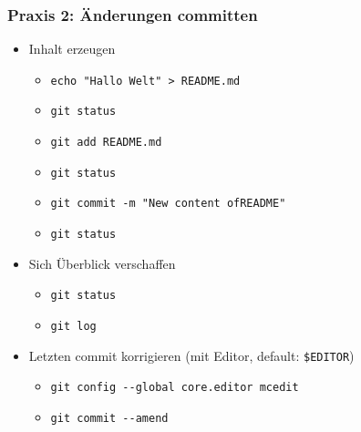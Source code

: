 \documentclass{beamer}
\begin{document}
\begin{frame}[label=gitintro40]
\frametitle{Praxis 2: Änderungen committen}
\begin{itemize}
 \item Inhalt erzeugen
\begin{itemize}
 \item \texttt{echo "{}Hallo Welt"{} > README.md}
 \item \texttt{git status}
 \item \texttt{git add README.md} \qquad {}
 \item \texttt{git status}
 \item \texttt{git commit -m "{}New content ofREADME"{}} \quad {}
 \item \texttt{git status}
\end{itemize}
 \bigskip
 \pause
 \pause
 \item Sich Überblick verschaffen
 \begin{itemize}
 \item \texttt{git status}
 \item \texttt{git log}
 \end{itemize}
 \pause
 \item Letzten commit korrigieren (mit Editor, default: \texttt{\$EDITOR})
 \begin{itemize}
 \item  \texttt{git config -{}-global core.editor mcedit}
 \item \texttt{git commit -{}-amend}
 \end{itemize}
\end{itemize}

\end{frame}
\end{document}
